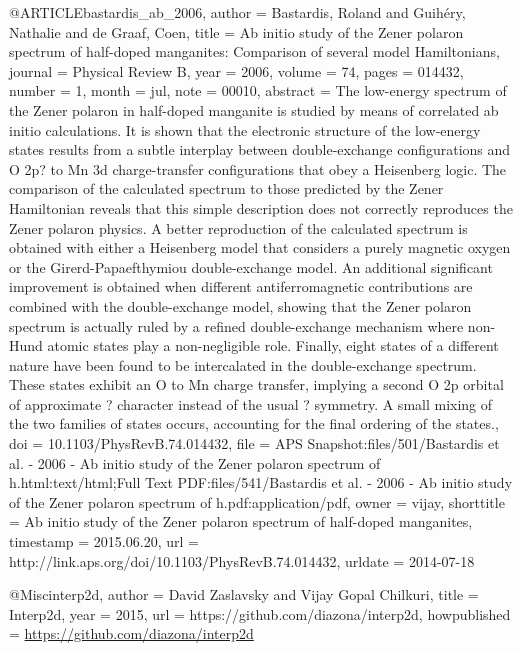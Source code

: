 @ARTICLE{bastardis_ab_2006,
  author = {Bastardis, Roland and Guih{\'e}ry, Nathalie and de Graaf, Coen},
  title = {Ab initio study of the {Zener} polaron spectrum of half-doped manganites:
	{Comparison} of several model {Hamiltonians}},
  journal = {Physical Review B},
  year = {2006},
  volume = {74},
  pages = {014432},
  number = {1},
  month = jul,
  note = {00010},
  abstract = {The low-energy spectrum of the Zener polaron in half-doped manganite
	is studied by means of correlated ab initio calculations. It is shown
	that the electronic structure of the low-energy states results from
	a subtle interplay between double-exchange configurations and O 2p?
	to Mn 3d charge-transfer configurations that obey a Heisenberg logic.
	The comparison of the calculated spectrum to those predicted by the
	Zener Hamiltonian reveals that this simple description does not correctly
	reproduces the Zener polaron physics. A better reproduction of the
	calculated spectrum is obtained with either a Heisenberg model that
	considers a purely magnetic oxygen or the Girerd-Papaefthymiou double-exchange
	model. An additional significant improvement is obtained when different
	antiferromagnetic contributions are combined with the double-exchange
	model, showing that the Zener polaron spectrum is actually ruled
	by a refined double-exchange mechanism where non-Hund atomic states
	play a non-negligible role. Finally, eight states of a different
	nature have been found to be intercalated in the double-exchange
	spectrum. These states exhibit an O to Mn charge transfer, implying
	a second O 2p orbital of approximate ? character instead of the usual
	? symmetry. A small mixing of the two families of states occurs,
	accounting for the final ordering of the states.},
  doi = {10.1103/PhysRevB.74.014432},
  file = {APS Snapshot:files/501/Bastardis et al. - 2006 - Ab initio study of the Zener polaron spectrum of h.html:text/html;Full Text PDF:files/541/Bastardis et al. - 2006 - Ab initio study of the Zener polaron spectrum of h.pdf:application/pdf},
  owner = {vijay},
  shorttitle = {Ab initio study of the {Zener} polaron spectrum of half-doped manganites},
  timestamp = {2015.06.20},
  url = {http://link.aps.org/doi/10.1103/PhysRevB.74.014432},
  urldate = {2014-07-18}
}

@Misc{interp2d,
  author       = {David Zaslavsky and Vijay Gopal Chilkuri},
  title        = {{I}nterp2d},
  year         = {2015},
  url          = {https://github.com/diazona/interp2d},
  howpublished = {\url{https://github.com/diazona/interp2d}}
}

